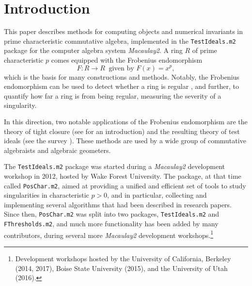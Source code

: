 \documentclass{amsart}
\begin{document}


\maketitle

\section{Introduction}

This paper describes methods for computing objects and numerical invariants in prime characteristic commutative algebra, implemented in the \texttt{TestIdeals.m2} package for the computer algebra system \emph{Macaulay2}.
A ring $R$ of prime characteristic $p$ comes equipped with the Frobenius endomorphism
\[ F: R \to R \ \text{ given by } F(x) =  x^p,\]
which is the basis for many constructions and methods.
Notably, the Frobenius endomorphism can be used to detect whether a ring is regular \cite{KunzCharacterizationsOfRegularLocalRings}, and further, to quantify how far a ring is from being regular, measuring the severity of a singularity.

In this direction, two notable applications of the Frobenius endomorphism are the theory of tight closure
(see \cite{HochsterHunekeTC1,HochsterFoundations} for an introduction)
and the resulting theory of test ideals
(see the survey \cite{SchwedeTuckerTestIdealSurvey}).  These methods are used by a wide group of commutative algebraists and algebraic geometers.

The \texttt{TestIdeals.m2} package was started during a \emph{Macaulay2} development workshop in 2012, hosted by Wake Forest University.
The package, at that time called \texttt{PosChar.m2}, aimed at providing a unified and efficient set of tools to study singularities in characteristic $p > 0$, and in particular, collecting and implementing several algorithms that had been described in research papers.
Since then, \texttt{PosChar.m2} was split into two packages, \texttt{TestIdeals.m2} and \texttt{FThresholds.m2}, and
much more functionality has been added by many contributors, during several more \emph{Macaulay2} development workshops.\footnote{Development workshops hosted by the University of California, Berkeley (2014, 2017), Boise State University (2015), and the University of Utah (2016).}
\end{document}
